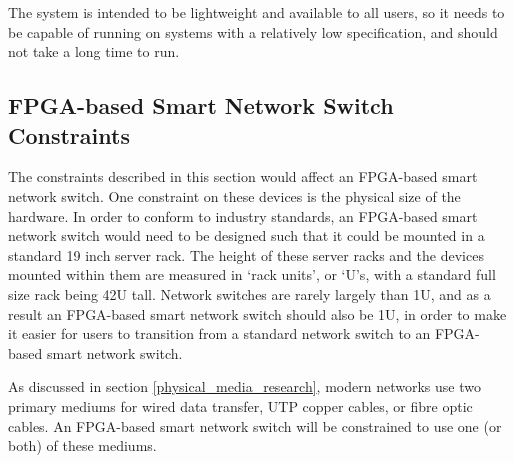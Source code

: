 The system is intended to be lightweight and available to all users, so it needs to be capable of running on systems with a relatively low specification, and should not take a long time to run.

\subsection{FPGA-based Smart Network Switch Constraints}
The constraints described in this section would affect an FPGA-based smart network switch. One constraint on these devices is the physical size of the hardware. In order to conform to industry standards, an FPGA-based smart network switch would need to be designed such that it could be mounted in a standard 19 inch server rack.
The height of these server racks and the devices mounted within them are measured in `rack units', or `U's, with a standard full size rack being 42U tall.
Network switches are rarely largely than 1U, and as a result an FPGA-based smart network switch should also be 1U, in order to make it easier for users to transition from a standard network switch to an FPGA-based smart network switch.

As discussed in section \ref{physical_media_research}, modern networks use two primary mediums for wired data transfer, UTP copper cables, or fibre optic cables. An FPGA-based smart network switch will be constrained to use one (or both) of these mediums.


